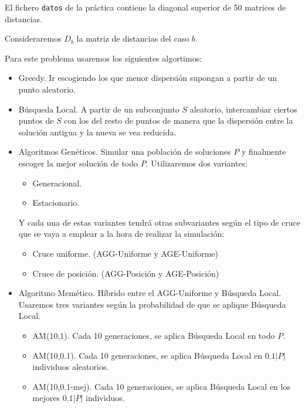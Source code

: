 \documentclass{article}
\begin{document}
    El fichero \texttt{datos} de la práctica contiene la diagonal superior de 50 matrices
    de distancias.
    
    Consideraremos $D_{b}$ la matriz de distancias del caso $b$.

    Para este problema usaremos los siguientes algortimos:

    \begin{itemize}
        \item Greedy.
        Ir escogiendo los que menor dispersión supongan a partir de un punto aleatorio.
        \item Búsqueda Local.
        A partir de un subconjunto $S$ aleatorio, intercambiar ciertos puntos de $S$ con los
        del resto de puntos de manera que la dispersión entre la solución antigua y la nueva
        se vea reducida.
        \item Algoritmos Genéticos.
        Simular una población de soluciones $P$ y finalmente escoger la mejor solución de
        todo $P$. Utilizaremos dos variantes:
        \begin{itemize}
            \item Generacional.
            \item Estacionario.
        \end{itemize}
        Y cada una de estas variantes tendrá otras subvariantes según el tipo de cruce que se
        vaya a emplear a la hora de realizar la simulación:
        \begin{itemize}
            \item Cruce uniforme. (AGG-Uniforme y AGE-Uniforme)
            \item Cruce de posición. (AGG-Posición y AGE-Posición)
        \end{itemize}
        \item Algoritmo Memético.
        Híbrido entre el AGG-Uniforme y Búsqueda Local. Usaremos tres variantes según la
        probabilidad de que se aplique Búsqueda Local.
        \begin{itemize}
            \item AM(10,1).
            Cada 10 generaciones, se aplica Búsqueda Local en todo $P$.
            \item AM(10,0.1).
            Cada 10 generaciones, se aplica Búsqueda Local en $0.1|P|$ individuos aleatorios.
            \item AM(10,0.1-mej).
            Cada 10 generaciones, se aplica Búsqueda Local en los mejores $0.1|P|$ individuos.
        \end{itemize}
    \end{itemize}
\end{document}
